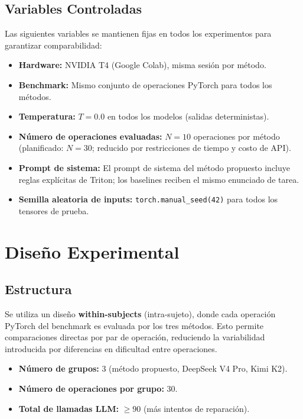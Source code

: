 \documentclass[12pt]{article}
\begin{document}
\subsection{Variables Controladas}

Las siguientes variables se mantienen fijas en todos los experimentos para garantizar
comparabilidad:

\begin{itemize}
  \item \textbf{Hardware:} NVIDIA T4 (Google Colab), misma sesión por método.
  \item \textbf{Benchmark:} Mismo conjunto de operaciones PyTorch para todos los métodos.
  \item \textbf{Temperatura:} $T = 0.0$ en todos los modelos (salidas deterministas).
  \item \textbf{Número de operaciones evaluadas:} $N = 10$ operaciones por método
    (planificado: $N = 30$; reducido por restricciones de tiempo y costo de API).
  \item \textbf{Prompt de sistema:} El prompt de sistema del método propuesto incluye
    reglas explícitas de Triton; los baselines reciben el mismo enunciado de tarea.
  \item \textbf{Semilla aleatoria de inputs:} \texttt{torch.manual\_seed(42)} para
    todos los tensores de prueba.
\end{itemize}

\section{Diseño Experimental}

\subsection{Estructura}

Se utiliza un diseño \textbf{within-subjects} (intra-sujeto), donde cada operación
PyTorch del benchmark es evaluada por los tres métodos. Esto permite comparaciones
directas por par de operación, reduciendo la variabilidad introducida por diferencias
en dificultad entre operaciones.

\begin{itemize}
  \item \textbf{Número de grupos:} 3 (método propuesto, DeepSeek V4 Pro, Kimi K2).
  \item \textbf{Número de operaciones por grupo:} 30.
  \item \textbf{Total de llamadas LLM:} $\geq 90$ (más intentos de reparación).
\end{itemize}
\end{document}
